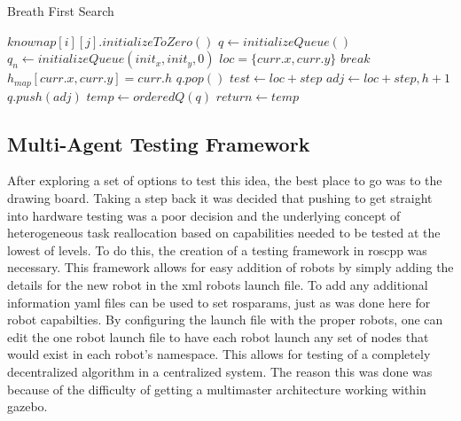 \begin{algorithm}[H]
\caption{Breath First Search}
\begin{algorithmic}[1]
    \State $knownap[i][j].initializeToZero()$
    \State $q \leftarrow initializeQueue()$
    \State $q_{n} \leftarrow initializeQueue(init_x, init_y, 0)$
        \State $loc = \{ curr.x, curr.y \}$
          \State $break$ 
        \EndIf
          \State $h_{map}[curr.x, curr.y] = curr.h$ 
          \State $q.pop()$ 
          
          \State $test \leftarrow loc + step$
            
            \State $adj \leftarrow {loc + step, h + 1}$ 
            \State $q.push(adj)$ 
            \label{path}
          \EndIf
        \EndIf
    \EndWhile
    \State $temp \leftarrow orderedQ(q)$ 
    \State $return \leftarrow temp$ 
\EndProcedure

\end{algorithmic}
\end{algorithm}


\subsection{Multi-Agent Testing Framework}

After exploring a set of options to test this idea, the best place to go was to the drawing
board. Taking a step back it was decided that pushing to get straight into hardware testing
was a poor decision and the underlying concept of heterogeneous task reallocation based on
capabilities needed to be tested at the lowest of levels. To do this, the creation of a testing
framework in roscpp was necessary. This framework allows for easy addition of robots by simply
adding the details for the new robot in the xml robots launch file. To add any additional information
yaml files can be used to set rosparams, just as was done here for robot capabilties. By configuring
the launch file with the proper robots, one can edit the one robot launch file to have each robot launch
any set of nodes that would exist in each robot's namespace. This allows for testing of a completely
decentralized algorithm in a centralized system. The reason this was done was because of the difficulty
of getting a multimaster architecture working within gazebo.
